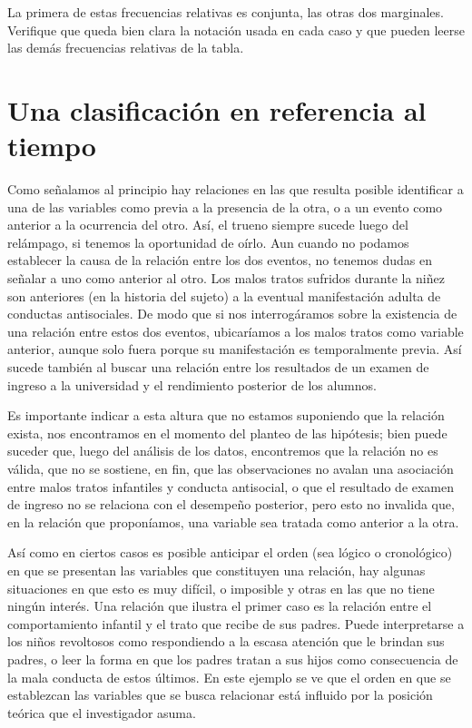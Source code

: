 \documentclass[]{book}
\begin{document}
La primera de estas frecuencias relativas es conjunta, las otras dos
marginales. Verifique que queda bien clara la notación usada en cada
caso y que pueden leerse las demás frecuencias relativas de la tabla.

\hypertarget{una-clasificaciuxf3n-en-referencia-al-tiempo}{%
\section{Una clasificación en referencia al tiempo}\label{una-clasificaciuxf3n-en-referencia-al-tiempo}}

Como señalamos al principio hay relaciones en las que resulta posible
identificar a una de las variables como previa a la presencia de la
otra, o a un evento como anterior a la ocurrencia del otro. Así, el
trueno siempre sucede luego del relámpago, si tenemos la oportunidad de
oírlo. Aun cuando no podamos establecer la causa de la relación entre
los dos eventos, no tenemos dudas en señalar a uno como anterior al
otro. Los malos tratos sufridos durante la niñez son anteriores (en la
historia del sujeto) a la eventual manifestación adulta de conductas
antisociales. De modo que si nos interrogáramos sobre la existencia de
una relación entre estos dos eventos, ubicaríamos a los malos tratos
como variable anterior, aunque solo fuera porque su manifestación es
temporalmente previa. Así sucede también al buscar una relación entre
los resultados de un examen de ingreso a la universidad y el rendimiento
posterior de los alumnos.

Es importante indicar a esta altura que no estamos suponiendo que la
relación exista, nos encontramos en el momento del planteo de las
hipótesis; bien puede suceder que, luego del análisis de los datos,
encontremos que la relación no es válida, que no se sostiene, en fin,
que las observaciones no avalan una asociación entre malos tratos
infantiles y conducta antisocial, o que el resultado de examen de
ingreso no se relaciona con el desempeño posterior, pero esto no
invalida que, en la relación que proponíamos, una variable sea tratada
como anterior a la otra.

Así como en ciertos casos es posible anticipar el orden (sea lógico o
cronológico) en que se presentan las variables que constituyen una
relación, hay algunas situaciones en que esto es muy difícil, o
imposible y otras en las que no tiene ningún interés. Una relación que
ilustra el primer caso es la relación entre el comportamiento infantil y
el trato que recibe de sus padres. Puede interpretarse a los niños
revoltosos como respondiendo a la escasa atención que le brindan sus
padres, o leer la forma en que los padres tratan a sus hijos como
consecuencia de la mala conducta de estos últimos. En este ejemplo se ve
que el orden en que se establezcan las variables que se busca relacionar
está influido por la posición teórica que el investigador asuma.
\end{document}
